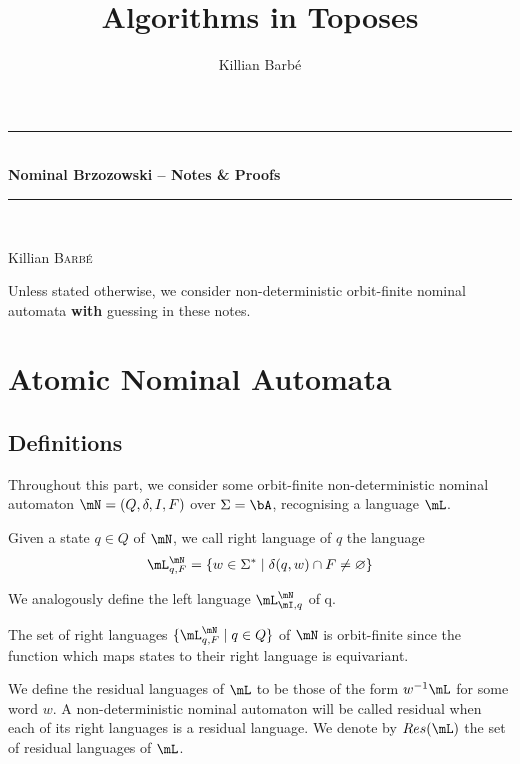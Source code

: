 \documentclass[a4paper, UKenglish, cleveref, autoref, numberwithinsect]{lipics-modified}
\title{Algorithms in Toposes}
\author{Killian {Barbé}}{ENS de Lyon, Lyon, France}{killian.barbe@ens-lyon.fr}{https://orcid.org/0009-0001-8345-9233}{}
\newcommand{\Res}{\mathsf{Res}}
\begin{document}
\fontsize{12}{14}\selectfont

\hypersetup{pageanchor=false}
\begin{center}
    \rule{\linewidth}{0.3mm} \\[0.4cm]
    {\huge \bfseries Nominal Brzozowski -- Notes \& Proofs}\\
    \rule{\linewidth}{0.3mm} \\[0.4cm]
    \begin{center} \Large
        Killian \textsc{Barbé}\\\vspace{1em}
    \end{center}
\end{center}

\setlength{\parindent}{0pt}

Unless stated otherwise, we consider non-deterministic orbit-finite nominal automata \textbf{with} guessing in these notes.

\section{Atomic Nominal Automata}

\subsection{Definitions}

Throughout this part, we consider some orbit-finite non-deterministic nominal automaton $\mN=(Q,\delta,I,F)$ over $\Sigma=\bA$, recognising a language $\mL$.

\begin{definition}

Given a state $q\in Q$ of $\mN$, we call right language of $q$ the language $$\mL_{q,F}^\mN=\{w\in\Sigma^*\mid\delta(q,w)\cap F\neq\varnothing\}$$

We analogously define the left language $\mL_{\mI,q}^{\mN}$ of q.

\end{definition}

\begin{note*}

The set of right languages $\{\mL_{q,F}^\mN\mid q\in Q\}$ of $\mN$ is orbit-finite since the function which maps states to their right language is equivariant.

\end{note*}

\begin{definition}

We define the residual languages of $\mL$ to be those of the form $w^{-1}\mL$ for some word $w$. A non-deterministic nominal automaton will be called residual when each of its right languages is a residual language. We denote by $\Res(\mL)$ the set of residual languages of $\mL$.

\end{definition}
\end{document}
